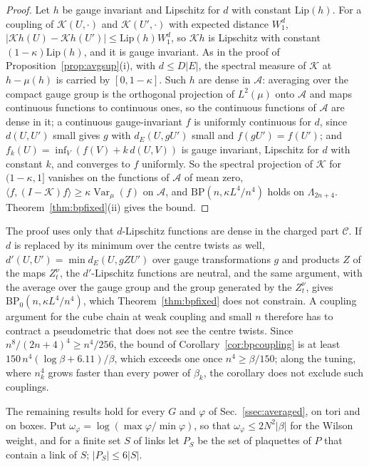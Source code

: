 \documentclass[aps,prd,twocolumn,superscriptaddress,nofootinbib,longbibliography,floatfix,amsmath,amssymb,10pt]{revtex4-2}
\theoremstyle{definition}
\theoremstyle{remark}
\newcommand{\Var}{\operatorname{Var}}
\newcommand{\ip}[2]{\langle #1,#2\rangle}
\begin{document}
\begin{proof}
Let $h$ be gauge invariant and Lipschitz for $d$ with constant $\mathrm{Lip}
(h)$. For a coupling of $\mathcal K(U,\cdot)$ and $\mathcal K(U',\cdot)$
with expected distance $W_1^d$, $\lvert\mathcal Kh(U)-\mathcal Kh(U')\rvert
\le\mathrm{Lip}(h)W_1^d$, so $\mathcal Kh$ is Lipschitz with constant $(1-
\kappa)\mathrm{Lip}(h)$, and it is gauge invariant. As in the proof of
Proposition~\ref{prop:avgsup}(i), with $d\le D\lvert E\rvert$, the spectral
measure of $\mathcal K$ at $h-\mu(h)$ is carried by $[0,1-\kappa]$. Such $h$
are dense in $\mathcal A$: averaging over the compact gauge group is the
orthogonal projection of $L^2(\mu)$ onto $\mathcal A$ and maps continuous
functions to continuous ones, so the continuous functions of $\mathcal A$
are dense in it; a continuous gauge-invariant $f$ is uniformly continuous
for $d$, since $d(U,U')$ small gives $g$ with $d_E(U,gU')$ small and $f(gU')
=f(U')$; and $f_k(U)=\inf_V(f(V)+k\,d(U,V))$ is gauge invariant, Lipschitz
for $d$ with constant $k$, and converges to $f$ uniformly. So the spectral
projection of $\mathcal K$ for $(1-\kappa,1]$ vanishes on the functions of
$\mathcal A$ of mean zero, $\ip f{(I-\mathcal K)f}\ge\kappa\Var_\mu(f)$ on
$\mathcal A$, and $\mathrm{BP}(n,\kappa L^4/n^4)$ holds on $\Lambda_{2n+4}$.
Theorem~\ref{thm:bpfixed}(ii) gives the bound.
\end{proof}

The proof uses only that $d$-Lipschitz functions are dense in the charged
part $\mathcal C$. If $d$ is replaced by its minimum over the centre twists
as well, $d'(U,U')=\min d_E(U,gZU')$ over gauge transformations $g$ and
products $Z$ of the maps $Z^\nu_t$, the $d'$-Lipschitz functions are neutral,
and the same argument, with the average over the gauge group and the
group generated by the $Z^\nu_t$, gives $\mathrm{BP}_0(n,\kappa L^4/n^4)$,
which Theorem~\ref{thm:bpfixed} does not constrain. A coupling argument for
the cube chain at weak coupling and small $n$ therefore has to contract a
pseudometric that does not see the centre twists. Since $n^8/(2n+4)^4\ge
n^4/256$, the bound of Corollary~\ref{cor:bpcoupling} is at least
$150\,n^4(\log\beta+6.11)/\beta$, which exceeds one once $n^4\ge\beta/150$;
along the tuning, where $n_k^4$ grows faster than every power of $\beta_k$,
the corollary does not exclude such couplings.

The remaining results hold for every $G$ and $\varphi$ of
Sec.~\ref{ssec:averaged}, on tori and on boxes. Put $\omega_\varphi=\log(
\max\varphi/\min\varphi)$, so that $\omega_\varphi\le2N^2\lvert\beta\rvert$
for the Wilson weight, and for a finite set $S$ of links let $P_S$ be the set
of plaquettes of $P$ that contain a link of $S$; $\lvert P_S\rvert\le6
\lvert S\rvert$.
\end{document}
